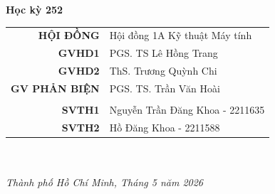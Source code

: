 \documentclass[a4paper,12pt]{report}
\theoremstyle{definition}
\theoremstyle{plain}
\begin{document}
\begin{titlepage}
    \vspace{5pt}
    \begin{center}
        {\Large{\textbf{Học kỳ 252}}} \\
        \vspace{40pt}
        \begin{tabular}{rl}
            \textbf{HỘI ĐỒNG}     & Hội đồng 1A Kỹ thuật Máy tính   \\
            \textbf{GVHD1}        & PGS. TS Lê Hồng Trang           \\
            \textbf{GVHD2}        & ThS. Trương Quỳnh Chi           \\
            \textbf{GV PHẢN BIỆN} & PGS. TS. Trần Văn Hoài          \\
                                  &                                 \\
            \textbf{SVTH1}        & Nguyễn Trần Đăng Khoa - 2211635 \\
            \textbf{SVTH2}        & Hồ Đăng Khoa - 2211588          \\
        \end{tabular}
    \end{center}


    \begin{center}
        ~\\
        ~\\
        \textit{Thành phố Hồ Chí Minh, Tháng 5 năm 2026}
    \end{center}
\end{titlepage}
\end{document}
